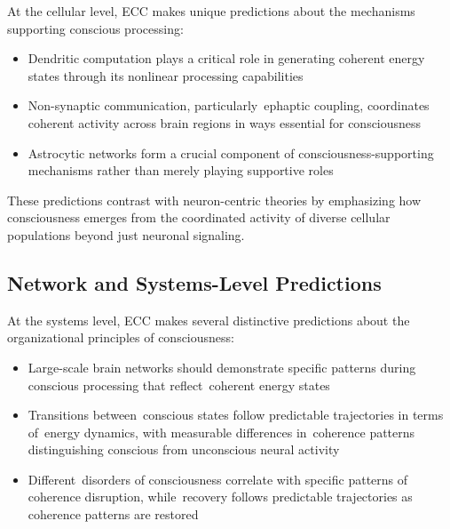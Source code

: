 At the cellular level, ECC makes unique predictions about the mechanisms supporting conscious processing:

\begin{itemize}
    \item {}Dendritic computation plays a critical role in generating coherent energy states through its nonlinear processing capabilities~\cite{Gidon2020, Beniaguev2021}
    
    \item {}Non-synaptic communication, particularly~ephaptic coupling, coordinates coherent activity across brain regions in ways essential for consciousness~\cite{anastassiou2015ephaptic, chiang2019slow}
    
    \item {}Astrocytic networks form a crucial component of consciousness-supporting mechanisms rather than merely playing supportive roles
\end{itemize}

These predictions contrast with neuron-centric theories by emphasizing how consciousness emerges from the coordinated activity of diverse cellular populations beyond just neuronal signaling.

\subsection*{Network and Systems-Level Predictions}

At the systems level, ECC makes several distinctive predictions about the organizational principles of consciousness:

\begin{itemize}
    \item {}Large-scale brain networks should demonstrate specific patterns during conscious processing that reflect~coherent energy states~\cite{Mashour2018, Bassett2017}
    
    \item Transitions between~conscious states follow predictable trajectories in terms of~energy dynamics, with measurable differences in~coherence patterns distinguishing conscious from unconscious neural activity~\cite{Palva2018, van2025processes}
    
    \item Different~disorders of consciousness correlate with specific patterns of coherence disruption, while~recovery follows predictable trajectories as coherence patterns are restored~\cite{Owen2013, Giacino2014}
\end{itemize}

